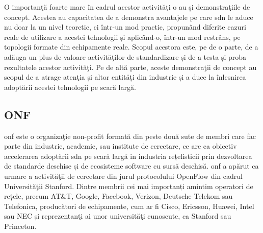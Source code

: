 O importanţă foarte mare în cadrul acestor activităţi o au și demonstraţiile de concept. Acestea au capacitatea de a demonstra avantajele pe care \gls{sdn} le aduce nu doar la un nivel teoretic, ci într-un mod practic, propunând diferite cazuri reale de utilizare a acestei tehnologii și aplicând-o, într-un mod restrâns, pe topologii formate din echipamente reale. Scopul acestora este, pe de o parte, de a adăuga un plus de valoare activităţilor de standardizare și de a testa și proba rezultatele acestor activităţi. Pe de altă parte, aceste demonstraţii de concept au scopul de a atrage atenţia și altor entități din industrie și a duce la înlesnirea adoptării acestei tehnologii pe scară largă.

\subsection{ONF}

\gls{onf} este o organizaţie non-profit formată din peste două sute de membri care fac parte din industrie, academie, sau institute de cercetare, ce are ca obiectiv accelerarea adoptării \gls{sdn} pe scară largă in industria rețelisticii prin dezvoltarea de standarde deschise și de ecosisteme software cu sursă deschisă. \gls{onf} a apărut ca urmare a activităţii de cercetare din jurul protocolului OpenFlow din cadrul Universităţii Stanford. Dintre membrii cei mai importanți amintim operatori de rețele, precum AT\&T, Google, Facebook, Verizon, Deutsche Telekom sau Telefonica, producători de echipamente, cum ar fi Cisco, Ericsson, Huawei, Intel sau NEC și reprezentanţi ai unor universităţi cunoscute, ca Stanford sau Princeton.

